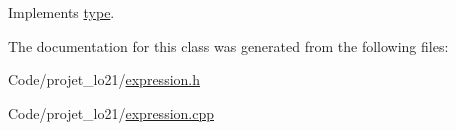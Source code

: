Implements \hyperlink{classtype_ab61f01d56f3896cc99788a1a18c4b0c2}{type}.



The documentation for this class was generated from the following files\-:\begin{DoxyCompactItemize}
\item 
Code/projet\-\_\-lo21/\hyperlink{expression_8h}{expression.\-h}\item 
Code/projet\-\_\-lo21/\hyperlink{expression_8cpp}{expression.\-cpp}\end{DoxyCompactItemize}
